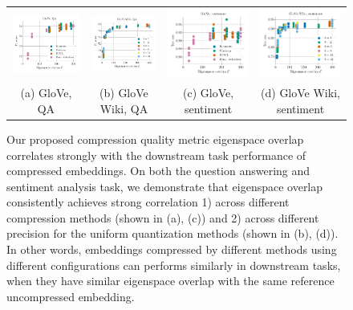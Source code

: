 
\begin{figure}
	\begin{tabular}{@{\hskip -0.0in}c@{\hskip -0.0in}c@{\hskip -0.0in}c@{\hskip -0.0in}c@{\hskip -0.0in}}
		\includegraphics[width=.245\linewidth]{figures/glove400k_qa_best-f1_vs_subspace-eig-overlap_linx.pdf} &
		\includegraphics[width=.245\linewidth]{figures/glove-wiki400k-am_qa_best-f1_vs_subspace-eig-overlap_linx.pdf} &
		\includegraphics[width=.245\linewidth]{figures/glove400k_sentiment_trec_test-acc_vs_subspace-eig-overlap_linx.pdf} &
		\includegraphics[width=.245\linewidth]{figures/glove-wiki400k-am_sentiment_trec_test-acc_vs_subspace-eig-overlap_linx.pdf}	\\
		(a) GloVe, QA & (b) GloVe Wiki, QA  & (c) GloVe, sentiment & (d) GloVe Wiki, sentiment
	\end{tabular}
	\label{fig:good_correlation}
	\caption{Our proposed compression quality metric eigenspace overlap correlates strongly with the downstream task performance of compressed embeddings.  On both the question answering and sentiment analysis task, we demonstrate that eigenspace overlap consistently achieves strong correlation 1) across different compression methods (shown in (a), (c)) and 2) across different precision for the uniform quantization methods (shown in (b), (d)). In other words, embeddings compressed by different methods using different configurations can performs similarly in downstream tasks, when they have similar eigenspace overlap with the same reference uncompressed embedding.}
\end{figure}
